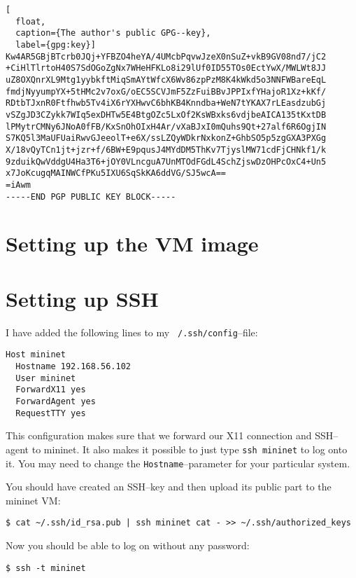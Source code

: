 \begin{lstlisting}[
  float,
  caption={The author's public GPG--key},
  label={gpg:key}]
Kw4AR5GBjBTcrb0JQj+YFBZO4heYA/4UMcbPqvwJzeX0nSuZ+vkB9GV08nd7/jC2
+CiHlTlrtoH40S7SdOGoZgNx7WHeHFKLo8i29lUf0ID55TOs0EctYwX/MWLWt8JJ
uZ8OXQnrXL9Mtg1yybkftMiqSmAYtWfcX6Wv86zpPzM8K4kWkd5o3NNFWBareEqL
fmdjNyyumpYX+5tHMc2v7oxG/oEC5SCVJmF5ZzFuiBBvJPPIxfYHajoR1Xz+kKf/
RDtbTJxnR0Ftfhwb5Tv4iX6rYXHwvC6bhKB4Knndba+WeN7tYKAX7rLEasdzubGj
vSZgJD3CZykk7WIq5exDHTw5E4BtgOZc5LxOf2KsWBxks6vdjbeAICA135tKxtDB
lPMytrCMNy6JNoA0fFB/KxSnOhOIxH4Ar/vXaBJxI0mQuhs9Qt+27alf6R6OgjIN
S7KQ5l3MaUFUaiRwvGJeeolT+e6X/ssLZQyWDkrNxkonZ+GhbSO5p5zgGXA3PXGg
X/18vQyTCn1jt+jzr+f/6BW+E9pqusJ4MYdDM5ThKv7TjyslMW71cdFjCHNkf1/k
9zduikQwVddgU4Ha3T6+jOY0VLncguA7UnMTOdFGdL4SchZjswDzOHPcOxC4+Un5
x7JoKcugqMAINWCfPKu5IXU6SqSkKA6ddVG/SJ5wcA==
=iAwm
-----END PGP PUBLIC KEY BLOCK-----
\end{lstlisting}
\clearpage %

\section{Setting up the VM image}


\section{Setting up SSH}
\label{chapter:ssh.setup}

I have added the following lines to my \texttt{~/.ssh/config}--file:

\begin{verbatim}
Host mininet
  Hostname 192.168.56.102
  User mininet
  ForwardX11 yes
  ForwardAgent yes
  RequestTTY yes
\end{verbatim}

This configuration makes sure that we forward our X11 connection and
SSH--agent to mininet.  It also makes it possible to just type \texttt{ssh
mininet} to log onto it.  You may need to change the
\texttt{Hostname}--parameter for your particular system.

You should have created an SSH--key and then upload its public part to the
mininet VM:

\begin{verbatim}
$ cat ~/.ssh/id_rsa.pub | ssh mininet cat - >> ~/.ssh/authorized_keys
\end{verbatim}

Now you should be able to log on without any password:

\begin{verbatim}
$ ssh -t mininet
\end{verbatim}

